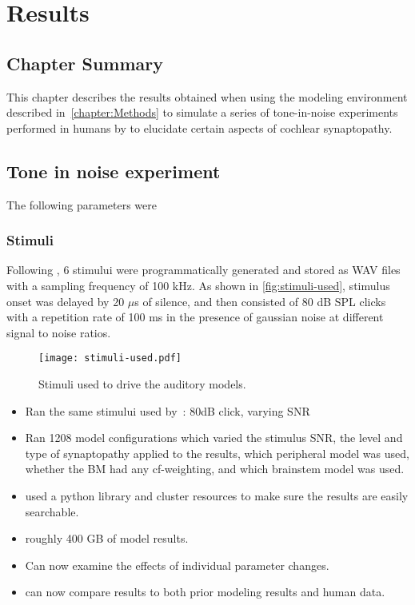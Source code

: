 \chapter{Results}
\label{chapter:Results}
\thispagestyle{myheadings}

\graphicspath{{5_Results/Figures/}}
\section{Chapter Summary} %
\label{sec:results_summary}
This chapter describes the results obtained when using the modeling environment described in~\autoref{chapter:Methods} to simulate a series of tone-in-noise experiments performed in humans by \citeauthor{Mehraei2016Auditory} to elucidate certain aspects of cochlear synaptopathy. 

\section{Tone in noise experiment} %
\label{sec:tone_in_noise}
The following parameters were 
\subsection{Stimuli} %
\label{sub:stimuli}
Following \citeauthor{Mehraei2015Auditory,Mehraei2016Auditory}, 6 stimului were programmatically generated and stored as WAV files with a sampling frequency of 100 kHz.  As shown in \autoref{fig:stimuli-used}, stimulus onset was delayed by 20 $\mu$s of silence, and then consisted of 80 dB SPL clicks with a repetition rate of 100 ms in the presence of gaussian noise at different signal to noise ratios. 

\begin{figure}[htbp]
	\centering
	\texttt{[image: stimuli-used.pdf]}
	\caption[Experimental Stimuli]{Stimuli used to drive the auditory models.}
	\label{fig:stimuli-used}
\end{figure}

\begin{itemize}
	\item Ran the same stimului used by~\cite{Mehraei2015Auditory}: 80dB click, varying SNR
	\item Ran 1208 model configurations which varied  the stimulus SNR, the level and type of synaptopathy applied to the results, which peripheral model was used, whether the BM had any cf-weighting, and which brainstem model was used. 
	\item used a python library and cluster resources to make sure the results are easily searchable. 
	\item roughly 400 GB of model results.
	\item Can now examine the effects of individual parameter changes. 
	\item can now compare results to both prior modeling results and human data. 
\end{itemize}


